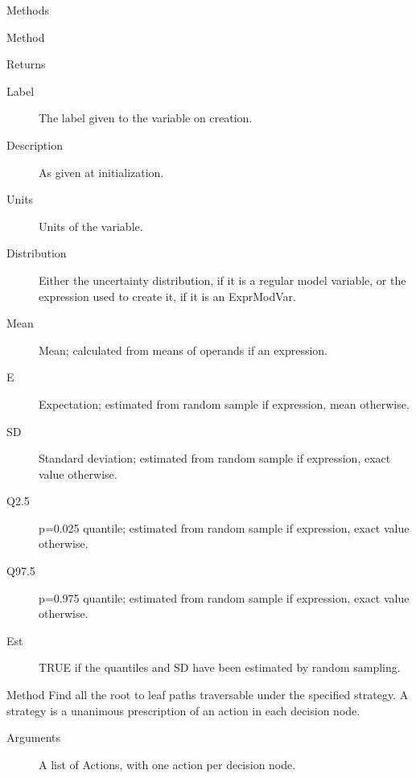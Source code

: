\documentclass[a4paper]{book}
\begin{document}
\begin{Section}{Methods}
\begin{SubSection}{Method }
\begin{SubSubSection}{Returns}
\begin{description}
\item[Label] The label given to the variable on creation.
\item[Description] As given at initialization.
\item[Units] Units of the variable.
\item[Distribution] Either the uncertainty distribution, if
it is a regular model variable, or the expression used to create it,
if it is an ExprModVar.
\item[Mean] Mean; calculated from means of operands if
an expression.
\item[E] Expectation; estimated from random sample if expression, 
mean otherwise.
\item[SD] Standard deviation; estimated from random sample if
expression, exact value otherwise.
\item[Q2.5] p=0.025 quantile; estimated from random sample if
expression, exact value otherwise.
\item[Q97.5] p=0.975 quantile; estimated from random sample if
expression, exact value otherwise.
\item[Est] TRUE if the quantiles and SD have been estimated by 
random sampling.

\end{description}

\end{SubSubSection}

\end{SubSection}



\hypertarget{method-paths_in_strategy}{}
%
\begin{SubSection}{Method }
Find all the root to leaf paths traversable under 
the specified strategy. A strategy is a unanimous prescription 
of an action in each decision node.
%


%
\begin{SubSubSection}{Arguments}

\begin{description}

\item[] A list of Actions, with one action per decision node.


\end{description}
\end{SubSubSection}
\end{SubSection}
\end{Section}
\end{document}
